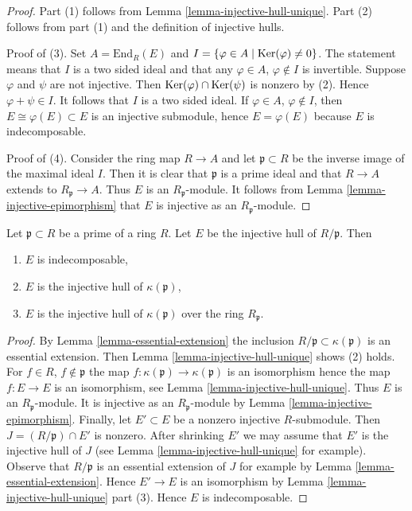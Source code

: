 \begin{proof}
Part (1) follows from Lemma \ref{lemma-injective-hull-unique}.
Part (2) follows from part (1) and the definition of injective hulls.

\medskip\noindent
Proof of (3). Set $A = \text{End}_R(E)$ and
$I = \{\varphi \in A \mid \mathop{\mathrm{Ker}}(\varphi) \not = 0\}$.
The statement means that $I$ is a two sided ideal and
that any $\varphi \in A$, $\varphi \not \in I$ is invertible.
Suppose $\varphi$ and $\psi$ are not injective.
Then $\mathop{\mathrm{Ker}}(\varphi) \cap \mathop{\mathrm{Ker}}(\psi)$ is nonzero
by (2). Hence $\varphi + \psi \in I$. It follows that $I$
is a two sided ideal. If $\varphi \in A$, $\varphi \not \in I$,
then $E \cong \varphi(E) \subset E$ is an injective submodule,
hence $E = \varphi(E)$ because $E$ is indecomposable.

\medskip\noindent
Proof of (4). Consider the ring map $R \to A$ and let $\mathfrak p \subset R$
be the inverse image of the maximal ideal $I$. Then it is clear
that $\mathfrak p$ is a prime ideal and that $R \to A$ extends to
$R_\mathfrak p \to A$. Thus $E$ is an $R_\mathfrak p$-module.
It follows from Lemma \ref{lemma-injective-epimorphism} that $E$ is injective
as an $R_\mathfrak p$-module.
\end{proof}

\begin{lemma}
\label{lemma-injective-hull-indecomposable}
Let $\mathfrak p \subset R$ be a prime of a ring $R$.
Let $E$ be the injective hull of $R/\mathfrak p$. Then
\begin{enumerate}
\item $E$ is indecomposable,
\item $E$ is the injective hull of $\kappa(\mathfrak p)$,
\item $E$ is the injective hull of $\kappa(\mathfrak p)$
over the ring $R_\mathfrak p$.
\end{enumerate}
\end{lemma}

\begin{proof}
By Lemma \ref{lemma-essential-extension} the inclusion
$R/\mathfrak p \subset \kappa(\mathfrak p)$ is an essential
extension. Then Lemma \ref{lemma-injective-hull-unique}
shows (2) holds. For $f \in R$, $f \not \in \mathfrak p$
the map $f : \kappa(\mathfrak p) \to \kappa(\mathfrak p)$ is an isomorphism
hence the map $f : E \to E$ is an isomorphism,
see Lemma \ref{lemma-injective-hull-unique}.
Thus $E$ is an $R_\mathfrak p$-module. It is injective
as an $R_\mathfrak p$-module by Lemma \ref{lemma-injective-epimorphism}.
Finally, let $E' \subset E$ be a nonzero injective $R$-submodule.
Then $J = (R/\mathfrak p) \cap E'$ is nonzero. After shrinking $E'$
we may assume that $E'$ is the injective hull of $J$ (see
Lemma \ref{lemma-injective-hull-unique} for example).
Observe that $R/\mathfrak p$ is an essential extension of $J$ for example by
Lemma \ref{lemma-essential-extension}. Hence $E' \to E$
is an isomorphism by Lemma \ref{lemma-injective-hull-unique} part (3).
Hence $E$ is indecomposable.
\end{proof}

